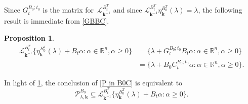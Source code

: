 \documentclass{amsart}
\newtheorem{proposition}{Proposition}[section]
\theoremstyle{definition}
\theoremstyle{remark}
\numberwithin{equation}{section}
\newcommand{\reals}{\mathbb R}
\newcommand{\sett}[1]{{\bigl\lbrace #1 \bigr\rbrace}}
\newcommand{\0}{{\mathbf{0}}}
\newcommand{\kk}{\mathbf{k}}
\renewcommand{\L}{\mathcal{L}}
\renewcommand{\P}{\mathcal{P}}
\begin{document}
Since $G_t^{B_0;t_0}$ is the matrix for~$\L_{\kk^{-1}}^{B_t^T}$ and since $\L_{\kk^{-1}}^{B_t^T}\eta_\kk^{B_0^T}(\lambda)=\lambda$, the following result is immediate from \cref{GBBC}.

\begin{proposition}\label{B0C}
\begin{align*}
\L_{\kk^{-1}}^{B_t^T}\sett{\eta_\kk^{B_0^T}(\lambda)+B_t\alpha:\alpha\in\reals^n,\alpha\ge0}
&=\sett{\lambda+G_t^{B_0;t_0}B_t\alpha:\alpha\in\reals^n,\alpha\ge0}\\
&=\sett{\lambda+B_0C_t^{B_0;t_0}\alpha:\alpha\in\reals^n,\alpha\ge0}.
\end{align*}
\end{proposition}

In light of \cref{B0C}, the conclusion of \cref{P in B0C} is equivalent to
\[\P^{B_0}_{\lambda,\kk}\subseteq\L_{\kk^{-1}}^{B_t^T}\sett{\eta_\kk^{B_0^T}(\lambda)+B_t\alpha:\alpha\ge0}.\]
\end{document}
